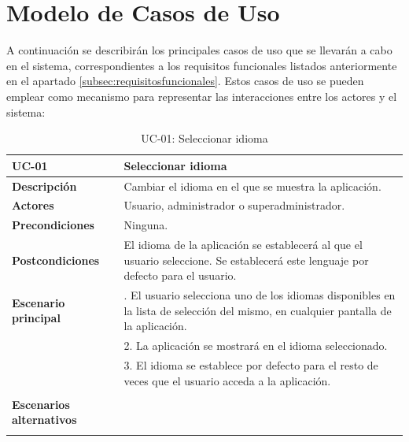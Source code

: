 \section{Modelo de Casos de Uso}

A continuación se describirán los principales casos de uso que se llevarán a cabo en el sistema, correspondientes a los requisitos funcionales listados anteriormente en el apartado \ref{subsec:requisitosfuncionales}. Estos casos de uso se pueden emplear como mecanismo para representar las interacciones entre los actores y el sistema:


\begin{table}[H]
  \begin{center}
    \begin{tabularx}{16.4cm}{|l|X|}
      \hline
      \textbf{UC-01} & \textbf{Seleccionar idioma}\\
      \hline
      \textbf{Descripción} & Cambiar el idioma en el que se muestra la aplicación.\\
      \hline
      \textbf{Actores} & Usuario, administrador o superadministrador.\\
      \hline
      \textbf{Precondiciones} & Ninguna.\\
      \hline
      \textbf{Postcondiciones} & El idioma de la aplicación se establecerá al que el usuario seleccione. Se establecerá este lenguaje por defecto para el usuario.\\
      \hline
      \textbf{Escenario principal} & \smallskip 1. El usuario selecciona uno de los idiomas disponibles en la lista de selección del mismo, en cualquier pantalla de la aplicación.\\
      & 2. La aplicación se mostrará en el idioma seleccionado.\\
      & 3. El idioma se establece por defecto para el resto de veces que el usuario acceda a la aplicación.\\
      & \\
      \hline
      \textbf{Escenarios alternativos} & \\
      & \\
      \hline
    \end{tabularx}
    \caption{UC-01: Seleccionar idioma}
    \label{tab:CU-idioma}
  \end{center}
\end{table}


